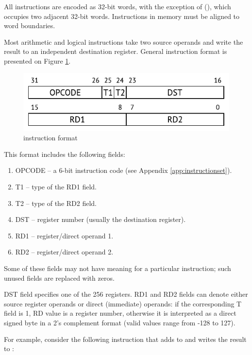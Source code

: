 \documentclass[a4paper,12pt,twoside,extrafontsizes]{memoir}
\begin{document}
All \lxp{} instructions are encoded as 32-bit words, with the exception of  (), which occupies two adjacent 32-bit words. Instructions in memory must be aligned to word boundaries.

Most arithmetic and logical instructions take two source operands and write the result to an independent destination register. General instruction format is presented on Figure \ref{fig:instructionformat}.

\begin{figure}[htbp]
	\centering
	\includegraphics[scale=1.2]{images/instructionformat.pdf}
	\caption{\lxp{} instruction format}
	\label{fig:instructionformat}
\end{figure}

This format includes the following fields:

\begin{enumerate}
	\item OPCODE -- a 6-bit instruction code (see Appendix \ref{app:instructionset}).
	\item T1 -- type of the RD1 field.
	\item T2 -- type of the RD2 field.
	\item DST -- register number (usually the destination register).
	\item RD1 -- register/direct operand 1.
	\item RD2 -- register/direct operand 2.
\end{enumerate}

Some of these fields may not have meaning for a particular instruction; such unused fields are replaced with zeros.

DST field specifies one of the 256 \lxp{} registers. RD1 and RD2 fields can denote either source register operands or direct (immediate) operands: if the corresponding T field is 1, RD value is a register number, otherwise it is interpreted as a direct signed byte in a 2's complement format (valid values range from -128 to 127).

For example, consider the following instruction that adds  to  and writes the result to :
\end{document}
